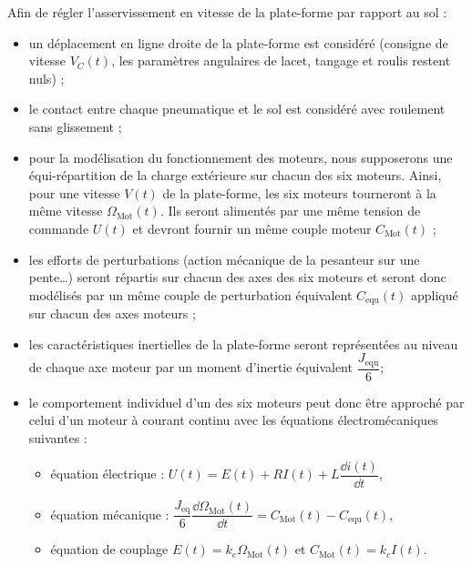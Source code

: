 \begin{hypo}
Afin de régler l’asservissement en vitesse de la plate-forme par rapport au sol :
\begin{itemize}
\item un déplacement en ligne droite de la plate-forme est considéré (consigne de vitesse $V_C(t)$, les paramètres
angulaires de lacet, tangage et roulis restent nuls) ;
\item le contact entre chaque pneumatique et le sol est considéré avec roulement sans glissement ;
\item pour la modélisation du fonctionnement des moteurs, nous supposerons une équi-répartition de la charge extérieure sur chacun des six moteurs. Ainsi, pour une vitesse $V (t)$ de la plate-forme, les six moteurs tourneront à la même vitesse $\Omega_{\text{Mot}}(t)$. Ils seront alimentés par une même tension de commande $U(t)$ et devront fournir un même couple moteur $C_{\text{Mot}}(t)$ ;
\item les efforts de perturbations (action mécanique de la pesanteur sur une pente…) seront répartis sur chacun des axes des six moteurs et seront donc modélisés par un même couple de perturbation équivalent $C_{\text{equ}}(t)$ appliqué sur chacun des axes moteurs ;
\item les caractéristiques inertielles de la plate-forme seront représentées au niveau de chaque axe moteur par un moment d’inertie équivalent $\dfrac{J_{\text{equ}}}{6}$;
\item le comportement individuel d’un des six moteurs peut donc être approché par celui d’un moteur à courant continu avec les équations électromécaniques suivantes :
\begin{itemize}
\item équation électrique : $U(t)=E(t)+RI(t)+L\dfrac{\dd i(t)}{\dd t}$,
\item équation mécanique : $\dfrac{J_{\text{eq}}}{6} \dfrac{\dd \Omega_{\text{Mot}}(t)}{\dd t} = C_{\text{Mot}}(t)-C_{\text{equ}}(t)$,
\item équation de couplage $E(t)=k_e\Omega_{\text{Mot}}(t)$ et $C_{\text{Mot}}(t) = k_c I(t)$.
\end{itemize}
\end{itemize}
\end{hypo}



